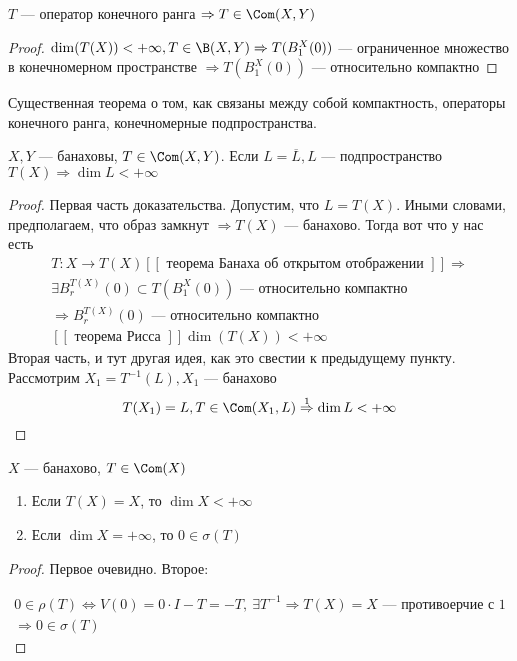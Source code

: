 \documentclass[document]{subfiles}
\begin{document}
\begin{statement}
    $T$ --- оператор конечного ранга $\Rightarrow T \in \Com(X, Y)$
\end{statement}

\begin{proof}
    $\dim(T(X)) < +\infty, T \in \B(X,Y) \Rightarrow T(B^X_1(0))$ --- ограниченное множество в конечномерном пространстве
     $\Rightarrow T(B^X_1(0))$ --- относительно компактно
\end{proof}

Существенная теорема о том, как связаны между собой компактность, операторы конечного ранга, конечномерные подпространства.

\begin{theorem}
    $X,Y$ --- банаховы, $T \in \Com(X,Y)$. Если $L = \overline{L}, L$ --- подпространство $T(X) \Rightarrow \dim L < +\infty$
\end{theorem}

\begin{proof}
    Первая часть доказательства. Допустим, что $L = T(X)$. Иными словами, предполагаем, что образ замкнут $\Rightarrow T(X)$ --- банахово. Тогда вот что у нас есть
    \begin{gather*}
        T: X \rightarrow T(X) [[\text{ теорема Банаха об открытом отображении }]] \Rightarrow \\
        \exists B_r^{T(X)}(0) \subset T(B^X_1(0)) \text{ --- относительно компактно} \\
        \Rightarrow B_r^{T(X)}(0) \text{ --- относительно компактно} \\
        [[\text{ теорема Рисса }]] \dim(T(X)) < +\infty
    \end{gather*}
    Вторая часть, и тут другая идея, как это свестии к предыдущему пункту. Рассмотрим $X_1 = T^{-1}(L), X_1$ --- банахово 
    \[ T(X_1) = L, T \in \Com(X_1, L) \stackrel{1}{\Rightarrow} \dim L < +\infty \]
\end{proof}

\begin{corollary}
    $X$ --- банахово, $T \in \Com(X)$
    \begin{enumerate}
        \item Если $T(X) = X$, то $\dim X < +\infty$ 
        \item Если $\dim X = +\infty$, то $0 \in \sigma(T)$
    \end{enumerate}
\end{corollary}

\begin{proof}
    Первое очевидно. Второе:

    \begin{gather*}
        0 \in \rho(T) \Leftrightarrow V(0) = 0 \cdot I - T = -T, \: \exists T^{-1} \Rightarrow T(X) = X \text{ --- противоерчие с 1} \\
        \Rightarrow 0 \in \sigma(T)
    \end{gather*}
\end{proof}
\end{document}
